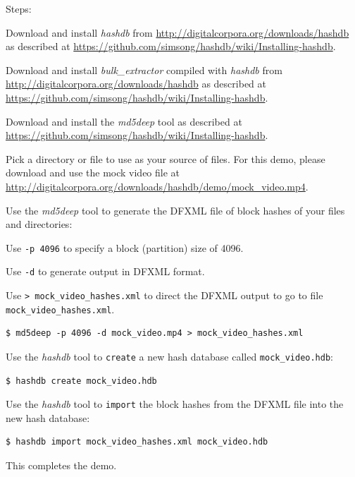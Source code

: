 \documentclass[12pt,twoside]{article}
\newcommand{\hdb}{\emph{hashdb}\xspace}
\newcommand{\bulk}{\emph{bulk\_extractor}\xspace}
\newcommand{\mdd}{\emph{md5deep}\xspace}
\begin{document}
Steps:
\begin{compactenum}
\item Download and install \hdb from
\url{http://digitalcorpora.org/downloads/hashdb}
as described at
\url{https://github.com/simsong/hashdb/wiki/Installing-hashdb}.
\item Download and install \bulk compiled with \hdb from
\url{http://digitalcorpora.org/downloads/hashdb}
as described at
\url{https://github.com/simsong/hashdb/wiki/Installing-hashdb}.
\item Download and install the \mdd tool as described at
\url{https://github.com/simsong/hashdb/wiki/Installing-hashdb}.
\item Pick a directory or file to use
as your source of files.
For this demo, please download and use the mock video file at
\url{http://digitalcorpora.org/downloads/hashdb/demo/mock\_video.mp4}.

\item Use the \mdd tool to generate the DFXML file of block hashes
of your files and directories:
\begin{compactitem}
\item Use \texttt{-p 4096} to specify a block (partition) size of 4096.
\item Use \texttt{-d} to generate output in DFXML format.
\item Use \texttt{> mock\_video\_hashes.xml} to direct the DFXML output
to go to file \\
\texttt{mock\_video\_hashes.xml}.
\end{compactitem}
\begin{verbatim}
$ md5deep -p 4096 -d mock_video.mp4 > mock_video_hashes.xml
\end{verbatim}

\item Use the \hdb tool to \texttt{create} a new hash database
called \texttt{mock\_video.hdb}:
\begin{verbatim}
$ hashdb create mock_video.hdb
\end{verbatim}

\item Use the \hdb tool to \texttt{import} the block hashes
from the DFXML file into the new hash database:
\begin{verbatim}
$ hashdb import mock_video_hashes.xml mock_video.hdb
\end{verbatim}
\end{compactenum}

This completes the demo.
\end{document}
